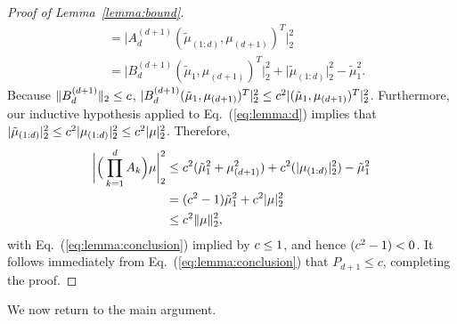 \begin{proof}[Proof of Lemma~\ref{lemma:bound}]
\begin{align*}
    &= \big|A^{(d+1)}_d(\tilde{\mu}_{(1:d)}, \mu_{(d+1)})^T\big|^2_2 \\
    &= \big|B^{(d+1)}_d (\tilde{\mu}_1, \mu_{(d+1)})^T\big|^2_2 + \big|\tilde{\mu}_{(1:d)}\big|^2_2 - \tilde{\mu}^2_1.
\end{align*}
Because $\|B^{(d+1)}_d\|_2 \leq c$, $|B^{(d+1)}_d (\tilde{\mu}_1, \mu_{(d+1)})^T|^2_2 \leq c^2|(\tilde{\mu}_1, \mu_{(d+1)})^T|^2_2$.
Furthermore, our inductive hypothesis applied to Eq.~(\ref{eq:lemma:d}) implies that
$|{\tilde{\mu}}_{(1:d)}|^2_2 \leq c^2|\mu_{(1:d)}|^2_2 \leq c^2|\mu|^2_2$.
Therefore,
\begin{align}
    \bigg|\Big(\prod_{k = 1}^d A_k\Big)\mu\bigg|^2_2 &\leq c^2({\tilde{\mu}}^2_1 + \mu_{(d+1)}^2) + c^2(|\mu_{(1:d)}|^2_2) - {\tilde{\mu}}^2_1 \\
    &= (c^2-1){\tilde{\mu}}^2_1 + c^2 |\mu|^2_2
    \\
    \label{eq:lemma:conclusion}
    &\leq c^2 \|\mu\|^2_2,
\end{align}
with Eq.~(\ref{eq:lemma:conclusion}) implied by $c \leq 1$, and hence $(c^2-1) < 0$.
It follows immediately from Eq.~(\ref{eq:lemma:conclusion}) that $P_{d+1}\le c$, completing the proof.
\end{proof}

We now return to the main argument.

